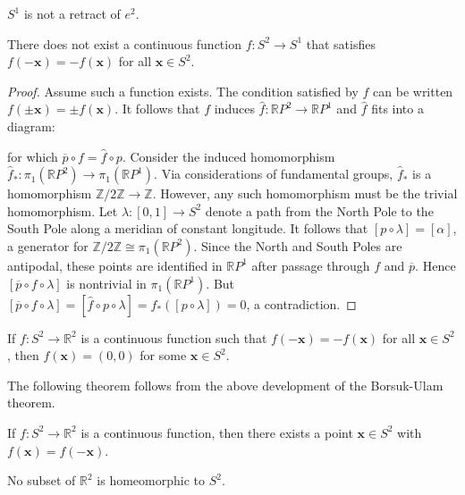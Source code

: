 \begin{corollary}
$S^1$ is not a retract of $e^2$.
\end{corollary}

\begin{proposition}[The Borsuk-Ulam Theorem for $n=2$]
There does not exist a continuous function $f : S^2 \rightarrow S^1$ that satisfies
$f(-\textbf{x}) = -f(\textbf{x})$ for all $\textbf{x} \in S^2$.
\end{proposition}

\begin{proof}
Assume such a function exists. The condition satisfied by $f$ can be written $f(\pm \textbf{x}) = \pm f(\textbf{x})$.
It follows that $f$ induces $\hat{f} : \mathbb{R}P^2 \rightarrow \mathbb{R}P^1$ and $\hat{f}$ fits into a diagram:
\begin{figure}[H]
  \centering
  
\end{figure}
for which $\overline{p} \circ f = \hat{f} \circ p$. Consider the induced homomorphism $\hat{f}_* : \pi_1(\mathbb{R}P^2) \rightarrow \pi_1(\mathbb{R}P^1)$.
Via considerations of fundamental groups, $\hat{f}_*$ is a homomorphism $\mathbb{Z}/2\mathbb{Z} \rightarrow \mathbb{Z}$. However, any such homomorphism must be
the trivial homomorphism. Let $\lambda: [0,1] \rightarrow S^2$ denote a path from the North Pole to the South Pole along a meridian of constant longitude.
It follows that $[p \circ \lambda] = [\alpha]$, a generator for $\mathbb{Z}/2\mathbb{Z} \cong \pi_1(\mathbb{R}P^2)$. Since the North and South Poles are antipodal,
these points are identified in $\mathbb{R}P^1$ after passage through $f$ and $\overline{p}$. Hence $[\overline{p} \circ f \circ \lambda]$ is nontrivial in $\pi_1(\mathbb{R}P^1)$.
But $[\overline{p} \circ f \circ \lambda] = [\hat{f} \circ p \circ \lambda] = \hat{f}_*([p \circ \lambda]) = 0$, a contradiction.
\end{proof}

\begin{corollary}
If $f: S^2 \rightarrow \mathbb{R}^2$ is a continuous function such that $f(-\textbf{x}) = -f(\textbf{x})$ for all $\textbf{x} \in S^2$,
then $f(\textbf{x}) = (0,0)$ for some $\textbf{x} \in S^2$.
\end{corollary}

\noindent The following theorem follows from the above development of the Borsuk-Ulam theorem.

\begin{theorem}
If $f: S^2 \rightarrow \mathbb{R}^2$ is a continuous function, then there exists a point $\textbf{x} \in S^2$ with $f(\textbf{x}) = f(-\textbf{x})$.
\end{theorem}

\begin{corollary}
No subset of $\mathbb{R}^2$ is homeomorphic to $S^2$.
\end{corollary}
